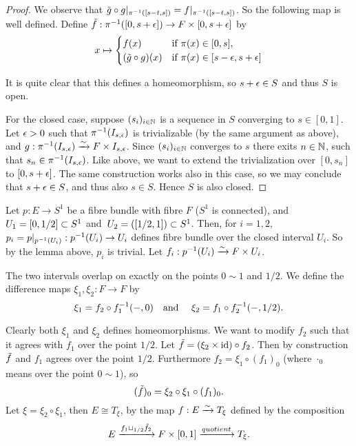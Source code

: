 \documentclass[a4paper,11pt,english]{article}
\begin{document}
\begin{exercise}[3]
\begin{proof}
We observe that $\til g\circ g|_{\pi\i([s-t,s])} = f|_{\pi\i([s-t,s])}$. So
the following map is well defined. Define $\til f: \pi\i([0,s+\eps]) \to F\times
[0,s+\eps]$ by
\[ x \mapsto \pwf{
f(x) &\tif \pi(x) \in [0,s], \\
(\til g \circ g)(x) &\tif \pi(x) \in [s-\eps,s+\eps] } \]

It is quite clear that this defines a homeomorphism, so $s + \eps \in S$ and
thus $S$ is open.

For the closed case, suppose $(s_i)_{i\in \N}$ is a sequence in $S$ converging
to $s \in [0,1]$. Let $\eps > 0$ such that $\pi\i(\Bes)$ is trivializable (by
the same argument as above), and $g : \pi\i(\Bes) \congto F \times \Bes$. Since
$(s_i)_{i\in \N}$ converges to $s$ there exits $n \in \N$, such that $s_n \in
\pi\i(\Bes)$. Like above, we want to extend the trivialization over $[0,s_n]$ to
$[0,s+\eps]$.
The same construction works also in this case, so we may conclude that
$s+\eps\in S$, and thus also $s\in S$. Hence $S$ is also closed.
\end{proof}

Let $p : E \to S^1$ be a fibre bundle with fibre $F$ ($S^1$ is connected), and
$U_1 = [0, 1/2] \ss S^1$ and $U_2 = ([1/2,1]) \ss S^1$. Then, for $i=1,2$, 
$p_i = p|_{p\i(U_i)} : p\i(U_i) \to U_i$ defines fibre bundle over the closed
interval $U_i$. So by the lemma above, $p_i$ is trivial. Let $f_i : p\i(U_i)
\congto F \times U_i$.

The two intervals overlap on exactly on the points $0 \sim 1$ and $1/2$. We define
the difference maps $\xi_1, \xi_2: F \to F$ by
\[ \xi_1 = f_2 \circ f_1\i(-,0) \qq\tand
\xi_2 = f_1 \circ f_2\i(-,1/2). \]

Clearly both $\xi_1$ and $\xi_2$ defines homeomorphisms. We want to modify $f_2$
such that it agrees with $f_1$ over the point $1/2$.
Let $\til f = (\xi_2 \times \id) \circ f_2$. Then by construction $\til f$ and
$f_1$ agrees over the point $1/2$. Furthermore $f_2 = \xi_1 \circ (f_1)_0$
(where $\cdot_0$ means over the point $0\sim 1$), so
\[ (\til f)_0 = \xi_2 \circ \xi_1 \circ (f_1)_0. \]
Let $\xi = \xi_2 \circ \xi_1$, then $E \cong T_\xi$, by the map $f : E \congto
T_\xi$ defined by the composition
\[ E \xto{ f_1 \sqcup_{1/2} \til f_2 } F \times [0,1]
\xto{quotient} T_\xi. \]
\end{exercise}
\end{document}
